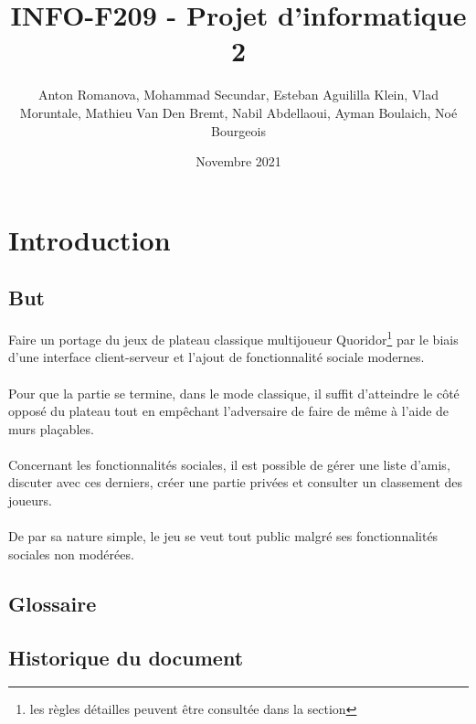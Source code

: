 \documentclass[french, utf8]{article}
\title{INFO-F209 - Projet d'informatique 2 }
\author{Anton Romanova, Mohammad Secundar, Esteban Aguililla Klein, Vlad Moruntale, Mathieu Van Den Bremt, Nabil Abdellaoui, Ayman Boulaich, Noé Bourgeois}
\date{Novembre 2021}
\begin{document}
\maketitle
\tableofcontents
\newpage


\section{Introduction}
\subsection{But}
Faire un portage du jeux de plateau classique multijoueur Quoridor\footnote{les règles détailles peuvent être consultée dans la section } par le biais d'une interface client-serveur et l'ajout de fonctionnalité sociale modernes.
\\ \\
Pour que la partie se termine, dans le mode classique, il suffit d'atteindre le côté opposé du plateau tout en empêchant l'adversaire de faire de même à l'aide de murs plaçables.    %
\\ \\
Concernant les fonctionnalités sociales, il est possible de gérer une liste d'amis, discuter avec ces derniers, créer une partie privées et consulter un classement des joueurs.
\\ \\
De par sa nature simple, le jeu se veut tout public malgré ses fonctionnalités sociales non modérées.  %

\subsection{Glossaire}

\subsection{Historique du document}
\end{document}
